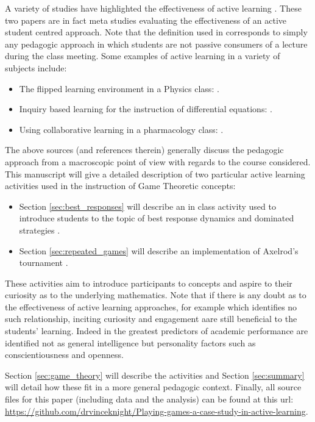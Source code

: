 \documentclass[12pt, a4paper]{article}
\begin{document}
A variety of studies have highlighted the effectiveness of active learning
\cite{Freeman2014, Hake1998, Prince2004}. These two papers are in fact meta
studies evaluating the effectiveness of an active student centred approach. Note
that the definition used in \cite{Freeman2014} corresponds to simply any
pedagogic approach in which students are not passive consumers of a lecture
during the class meeting. Some examples of active learning in a variety of
subjects include:

\begin{itemize}
    \item The flipped learning environment in a Physics class: \cite{Bates}.
    \item Inquiry based learning for the instruction of differential equations:
        \cite{Kwon2005}.
    \item Using collaborative learning in a pharmacology class:
        \cite{Depaz2008}.
\end{itemize}

The above sources (and references therein) generally discuss the pedagogic
approach from a macroscopic point of view with regards to the course considered.
This manuscript will give a detailed description of two particular active
learning activities used in the instruction of Game Theoretic concepts:

\begin{itemize}
    \item Section \ref{sec:best_responses} will describe an in class activity
        used to introduce students to the topic of best response dynamics and
        dominated strategies \cite{Maschler2013}.
    \item Section \ref{sec:repeated_games} will describe an implementation of
        Axelrod's tournament \cite{Axelrod1980a, Axelrod1980b}.
\end{itemize}

These activities aim to introduce participants to concepts and aspire to their
curiosity as to the underlying mathematics. Note that if there is any doubt as
to the effectiveness of active learning approaches, for example
\cite{Andrews2011} which identifies no such relationship, inciting curiosity and
engagement aare still beneficial to the students' learning.  Indeed in
\cite{Poropat2014}  the greatest predictors of academic performance are
identified not as general intelligence \cite{Wright1905} but personality factors
such as conscientiousness and openness.

Section \ref{sec:game_theory} will describe the activities and Section
\ref{sec:summary} will detail how these fit in a more general pedagogic context.
Finally, all source files for this paper (including data and the analysis) can
be found at this url:
\url{https://github.com/drvinceknight/Playing-games-a-case-study-in-active-learning}.
\end{document}
